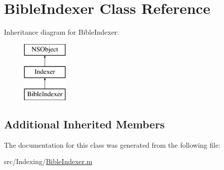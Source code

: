 \hypertarget{interface_bible_indexer}{\section{Bible\-Indexer Class Reference}
\label{interface_bible_indexer}
}
Inheritance diagram for Bible\-Indexer\-:\begin{figure}[H]
\begin{center}
\leavevmode
\includegraphics[height=3.000000cm]{interface_bible_indexer}
\end{center}
\end{figure}
\subsection*{Additional Inherited Members}


The documentation for this class was generated from the following file\-:\begin{DoxyCompactItemize}
\item 
src/\-Indexing/\hyperlink{_bible_indexer_8m}{Bible\-Indexer.\-m}\end{DoxyCompactItemize}
